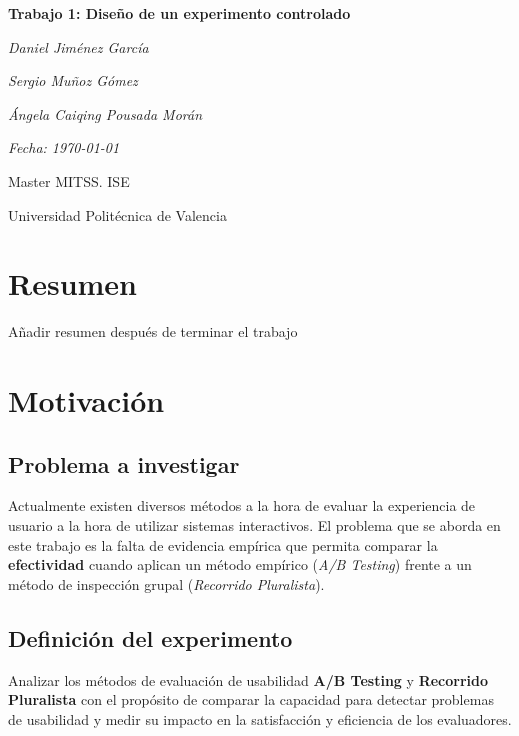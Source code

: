 \documentclass[a4paper,12pt]{report}
\begin{document}
\begin{titlepage}
    \centering
    \vspace*{3cm}
    {\Huge\bfseries Trabajo 1: Diseño de un experimento controlado \par}
    \vspace{2cm}
    {\Large\itshape Daniel Jiménez García \par}
    {\Large\itshape Sergio Muñoz Gómez \par}
    {\Large\itshape Ángela Caiqing Pousada Morán \par}
    \vspace{1cm}
    {\Large\itshape Fecha: \today \par}
    \vfill
    {\large Master MITSS. ISE \par}
    {\large Universidad Politécnica de Valencia\par}
\end{titlepage}


\chapter*{Resumen}

Añadir resumen después de terminar el trabajo


\chapter{Motivación}

\section{Problema a investigar}
Actualmente existen diversos métodos a la hora de evaluar la experiencia de usuario a la hora de utilizar sistemas interactivos. El problema que se aborda en este trabajo es la falta de evidencia empírica que permita comparar la \textbf{efectividad} cuando aplican un método empírico (\textit{A/B Testing}) frente a un método de inspección grupal (\textit{Recorrido Pluralista}).

\section{Definición del experimento}
Analizar los métodos de evaluación de usabilidad \textbf{A/B Testing} y \textbf{Recorrido Pluralista} con el propósito de comparar la capacidad para detectar problemas de usabilidad y medir su impacto en la satisfacción y eficiencia de los evaluadores.
\end{document}

